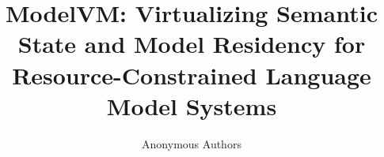 \documentclass[10pt,twocolumn]{article}
\title{\textbf{ModelVM: Virtualizing Semantic State and Model Residency for Resource-Constrained Language Model Systems}}
\author{Anonymous Authors}
\date{}
\begin{document}
\maketitle














\FloatBarrier


\end{document}
